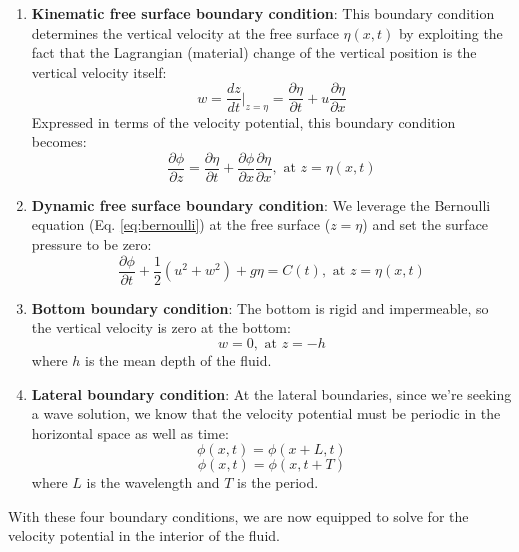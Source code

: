 \documentclass[12pt]{article}
\numberwithin{equation}{section}
\numberwithin{figure}{section}
\numberwithin{table}{section}
\begin{document}
\begin{enumerate}
  \item \textbf{Kinematic free surface boundary condition}:
  This boundary condition determines the vertical velocity at the free surface
  $\eta(x, t)$ by exploiting the fact that the Lagrangian (material) change of
  the vertical position is the vertical velocity itself:
  \begin{equation}
    w = \frac{dz}{dt}\Big|_{z=\eta} = \frac{\partial \eta}{\partial t} + u \frac{\partial \eta}{\partial x}
    \label{eq:kfsbc}
  \end{equation}
  Expressed in terms of the velocity potential, this boundary condition becomes:
  \begin{equation}
    \frac{\partial \phi}{\partial z} =
    \frac{\partial \eta}{\partial t} +
    \frac{\partial \phi}{\partial x} \frac{\partial \eta}{\partial x}, \text{ at } z=\eta(x, t)
  \end{equation}
  \item \textbf{Dynamic free surface boundary condition}:
  We leverage the Bernoulli equation (Eq. \ref{eq:bernoulli}) at the free surface
  ($z = \eta$) and set the surface pressure to be zero:
  \begin{equation}
    \frac{\partial \phi}{\partial t} + \frac{1}{2} \left(u^2 + w^2\right) + g\eta = C(t), \text{ at } z=\eta(x, t)
  \end{equation}
  \item \textbf{Bottom boundary condition}:
  The bottom is rigid and impermeable, so the vertical velocity is zero at the
  bottom:
  \begin{equation}
    w = 0, \text{ at } z = -h
  \end{equation}
  where $h$ is the mean depth of the fluid.
  \item \textbf{Lateral boundary condition}:
  At the lateral boundaries, since we're seeking a wave solution, we know that
  the velocity potential must be periodic in the horizontal space as well as
  time:
  \begin{equation}
    \phi(x, t) = \phi(x+L, t)
  \end{equation}
  \begin{equation}
    \phi(x, t) = \phi(x, t+T)
  \end{equation}
  where $L$ is the wavelength and $T$ is the period.
\end{enumerate}
With these four boundary conditions, we are now equipped to solve for the velocity
potential in the interior of the fluid.
\end{document}
